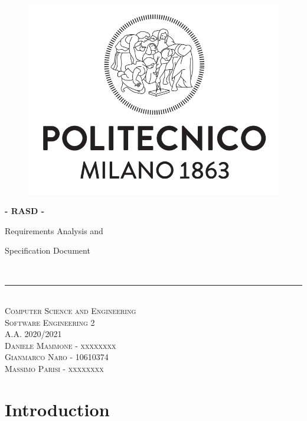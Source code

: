 \documentclass{article}
\begin{document}
\begin{titlepage}
	\begin{center}
		\begin{figure}
			\centering
			\includegraphics[scale=0.3]{LogoPolimi.PNG} \\
			[0.3cm]
		\end{figure}
		\Huge{\bfseries - RASD -} \\
		[0.5cm]
		\huge{Requirements Analysis and
			
			Specification Document} \\
		[1mm]
		\rule{300pt}{3pt} \\
		[1.0cm]
		\textsc{\Large Computer Science and Engineering} \\ 
		\textsc{\Huge Software Engineering 2} \\
		\textsc{\Large A.A. 2020/2021} \\
		[2cm]
		\textsc{\LARGE Daniele Mammone - xxxxxxxx} \\
		\textsc{\LARGE Gianmarco Naro - 10610374} \\
		\textsc{\LARGE Massimo Parisi - xxxxxxxx} \\
	\end{center}
\end{titlepage}

\newpage
	
	\renewcommand\contentsname{Indice}
	\tableofcontents
	
\newpage

\section{Introduction}
\end{document}
